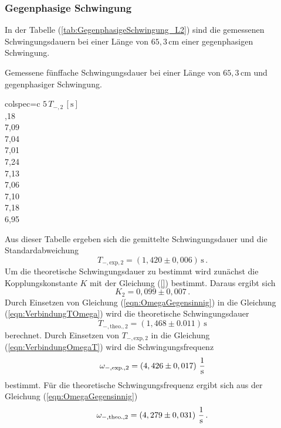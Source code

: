 \subsubsection{Gegenphasige Schwingung}
\label{sec:GegenphasigeSchwingung_LangesPendel}
In der Tabelle (\ref{tab:GegenphasigeSchwingung_L2}) sind die gemessenen Schwingungsdauern bei einer Länge von $65,3\, \unit{\centi\meter}$ einer gegenphasigen
Schwingung. 
\begin{table}[H]
  \centering
  \caption{Gemessene fünffache Schwingungsdauer bei einer Länge von $65,3\, \unit{\centi\meter}$ und gegenphasiger Schwingung.}
  \label{tab:GegenphasigeSchwingung_L2}
  \begin{tblr}{colspec={c}}
      \toprule
      $5\, T_{-, 2}\,\left[\unit{\second}\right]$\\
      ,18 \\
      7,09 \\
      7,04 \\
      7,01 \\
      7,24 \\
      7,13 \\
      7,06 \\
      7,10 \\
      7,18 \\
      6,95 \\
      \bottomrule
  \end{tblr}
\end{table}
Aus dieser Tabelle ergeben sich die gemittelte Schwingungsdauer und die Standardabweichung
$$T_{-,\text{exp},2} = \left(1,420 \pm 0,006\right)\,\unit{\second}\,.$$
Um die theoretische Schwingungsdauer zu bestimmt wird zunächst die Kopplungskonstante $K$ mit der
Gleichung (\ref{}) bestimmt. Daraus ergibt sich
$$K_{2} = 0,099 \pm 0,007\,.$$
Durch Einsetzen von Gleichung (\ref{eqn:OmegaGegensinnig}) in die Gleichung (\ref{eqn:VerbindungTOmega}) wird die theoretische Schwingungsdauer 
$$T_{-,\text{theo.},2} = \left( 1,468 \pm 0.011 \right)\,\unit{\second}$$ berechnet. Durch Einsetzen von
$T_{-,\text{exp},2}$ in die Gleichung (\ref{eqn:VerbindungOmegaT}) wird die Schwingungsfrequenz 
$$\omega_{-,\text{exp.},2} = \left(4,426 \pm 0,017 \right)\, \unit[per-mode=fraction]{\per\second}$$ bestimmt. 
Für die theoretische Schwingungsfrequenz ergibt sich aus der Gleichung (\ref{eqn:OmegaGegensinnig}) 
$$\omega_{-,\text{theo.},2} = \left( 4,279 \pm 0,031 \right)\, \unit[per-mode=fraction]{\per\second}\,.$$
%
%
